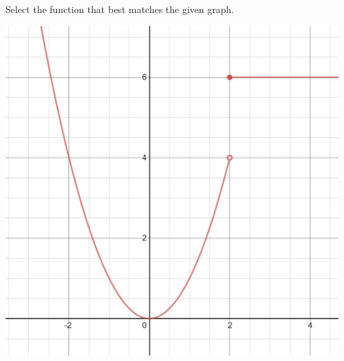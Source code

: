 \documentclass{ximera}
\begin{document}
\begin{problem}\label{prob:160hom2prob4}
Select the function that best matches the given graph.
\begin{image}
   \includegraphics[height=5in]{160H2pic6.jpg}
 \end{image}
\begin{multipleChoice}  
\end{multipleChoice}  
\end{problem}
\end{document}
